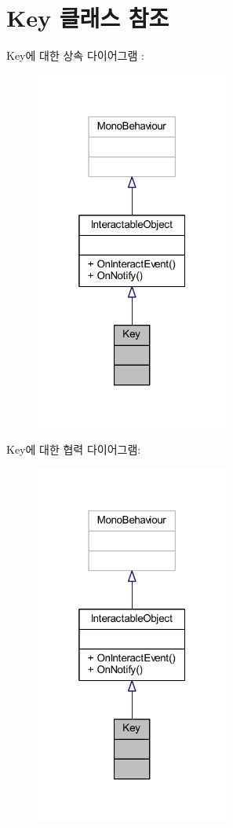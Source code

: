 \hypertarget{class_key}{}\section{Key 클래스 참조}
\label{class_key}


Key에 대한 상속 다이어그램 \+: 
\nopagebreak
\begin{figure}[H]
\begin{center}
\leavevmode
\includegraphics[width=181pt]{d2/d27/class_key__inherit__graph}
\end{center}
\end{figure}


Key에 대한 협력 다이어그램\+:
\nopagebreak
\begin{figure}[H]
\begin{center}
\leavevmode
\includegraphics[width=181pt]{d2/dac/class_key__coll__graph}
\end{center}
\end{figure}
